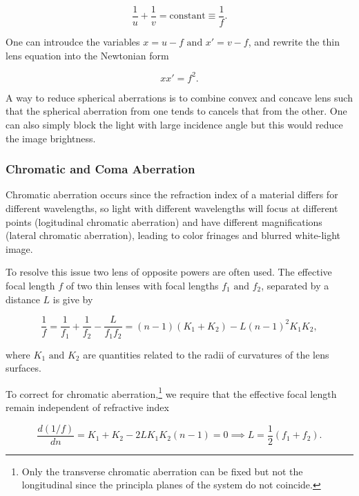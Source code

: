 \documentclass[english,a4paper,12pt]{report}
\begin{document}
\begin{equation}
    \frac{1}{u} + \frac{1}{v} = \text{constant} \equiv \frac{1}{f}. 
\end{equation}

One can introudce the variables \(x = u-f \text { and } x'= v-f\), and rewrite the thin lens equation into the Newtonian form

\begin{equation}
    xx' = f^2.
\end{equation}

A way to reduce spherical aberrations is to combine convex and concave lens such that the spherical aberration from one tends to cancels that from the other. One can also simply block the light with large incidence angle but this would reduce the image brightness.

\subsubsection{Chromatic and Coma Aberration}

Chromatic aberration occurs since the refraction index of a material differs for different wavelengths, so light with different wavelengths will focus at different points (logitudinal chromatic aberration) and have different magnifications (lateral chromatic aberration), leading to color frinages and blurred white-light image.

To resolve this issue two lens of opposite powers are often used. The effective focal length \(f\) of two thin lenses with focal lengths \(f_1 \text { and } f_2 \), separated by a distance \(L\) is give by 

\begin{equation}
    \frac{1}{f} = \frac{1}{f_1 } + \frac{1}{f_2 } - \frac{L}{f_1 f_2 } = (n-1)(K_1 +K_2 ) - L(n-1)^2K_1 K_2,
\end{equation}

where \(K_1 \text { and } K_2 \) are quantities related to the radii of curvatures of the lens surfaces.

To correct for chromatic aberration,\footnote{Only the transverse chromatic aberration can be fixed but not the longitudinal since the principla planes of the system do not coincide.} we require that the effective focal length remain independent of refractive index

\begin{equation}
    \frac{d(1 /f)}{dn} = K_1 + K_2 - 2LK_1 K_2 (n-1) = 0 \implies L = \frac{1}{2}(f_1 +f_2 ).  
\end{equation}
\end{document}
